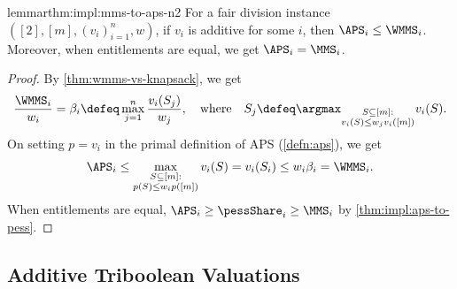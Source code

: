 \begin{restatable}[WMMS $\fimplies$ APS for $n=2$]{lemma}{rthm:impl:mms-to-aps-n2}
\label{thm:impl:mms-to-aps-n2}
For a fair division instance $([2], [m], (v_i)_{i=1}^n, w)$,
if $v_i$ is additive for some $i$, then $\APS_i \le \WMMS_i$.
Moreover, when entitlements are equal, we get $\APS_i = \MMS_i$.
\end{restatable}
\begin{proof}
By \cref{thm:wmms-vs-knapsack}, we get
\[ \frac{\WMMS_i}{w_i} = \beta_i \defeq \max_{j=1}^n \frac{v_i(S_j)}{w_j},
\quad\textrm{where}\quad
S_j \defeq \argmax_{\substack{S \subseteq [m]:\\ v_i(S) \le w_jv_i([m])}} v_i(S). \]
On setting $p = v_i$ in the primal definition of APS (\cref{defn:aps}), we get
\[ \APS_i \le \max_{\substack{S \subseteq [m]:\\ p(S) \le w_ip([m])}} v_i(S)
    = v_i(S_i) \le w_i\beta_i = \WMMS_i. \]
When entitlements are equal, $\APS_i \ge \pessShare_i \ge \MMS_i$
by \cref{thm:impl:aps-to-pess}.
\end{proof}

\subsection{Additive Triboolean Valuations}
\label{sec:impls-extra:tribool}

